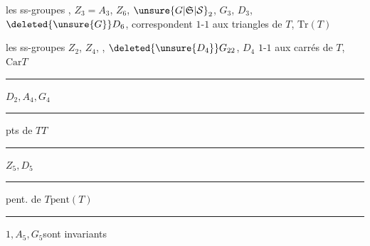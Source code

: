 les ss-groupes , $Z_3=A_3$, $Z_6$, ${\unsure{G|\mathfrak S|\mathcal S}}_2$, $G_3$, $D_3$, $\deleted{\unsure{G}}D_6$, correspondent $1$-$1$ aux triangles de $T$, $\boxed{\mathrm{Tr}(T)}$

les ss-groupes $Z_2$, $Z_4$, , $\deleted{\unsure{D_4}}G_{22}$, $D_4$  $1$-$1$ aux carrés de $T$, $\boxed{\mathrm{Car}T}$

\noindent\rule{3.6em}{.4pt}\quad $D_2,A_4,G_4$\qquad\rule{5em}{.4pt}\quad pts de $T$\quad$\boxed{T}$

\noindent\rule{3.6em}{.4pt}\quad $Z_5,D_5$\qquad\rule{5em}{.4pt}\quad pent. de $T$\quad$\boxed{\mathrm{pent}(T)}$

\noindent\rule{3.6em}{.4pt}\quad $1,A_5,G_5$\quad sont invariants

